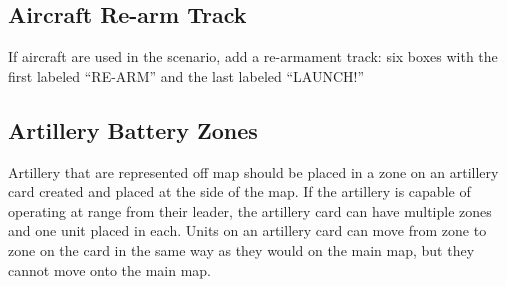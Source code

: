 \subsection{Aircraft Re-arm Track}\label{sec:Aircraft Re-arm Track}

If aircraft are used in the scenario, add a re-armament track: six
boxes with the first labeled ``RE-ARM'' and the last labeled ``LAUNCH!''

\subsection{Artillery Battery Zones}\label{sec:artillery-battery-zones}

Artillery that are represented off map should be placed in a zone on
an artillery card created and placed at the side of the map. If the
artillery is capable of operating at range from their leader, the
artillery card can have multiple zones and one unit placed in each.
Units on an artillery card can move from zone to zone on the card in
the same way as they would on the main map, but they cannot move onto
the main map.

